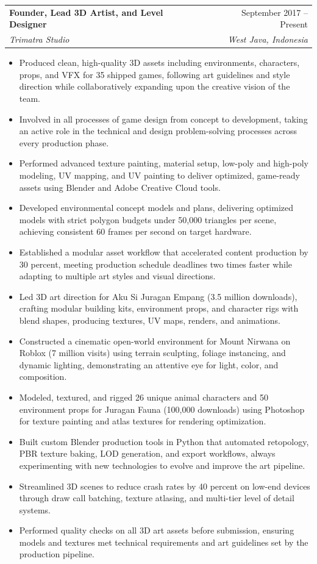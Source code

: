 \documentclass[letterpaper,11pt]{article}
\makeatletter
\newcommand{\resumeItem}[1]{
  \item\small{
    {#1 \vspace{-2pt}}
  }
}
\newcommand{\resumeSubheading}[4]{
  \vspace{-2pt}\item
    \begin{tabular*}{0.97\textwidth}[t]{l@{\extracolsep{\fill}}r}
      \textbf{#1} & #2 \\
      \textit{\small#3} & \textit{\small #4} \\
    \end{tabular*}\vspace{-7pt}
}
\newcommand{\resumeItemListStart}{\begin{itemize}}
\newcommand{\resumeItemListEnd}{\end{itemize}\vspace{-5pt}}
\makeatother
\begin{document}
    \resumeSubheading
      {Founder, Lead 3D Artist, and Level Designer}{September 2017 -- Present}
      {Trimatra Studio}{West Java, Indonesia}
      \resumeItemListStart
        \resumeItem{Produced clean, high-quality 3D assets including environments, characters, props, and VFX for 35 shipped games, following art guidelines and style direction while collaboratively expanding upon the creative vision of the team.}
        \resumeItem{Involved in all processes of game design from concept to development, taking an active role in the technical and design problem-solving processes across every production phase.}
        \resumeItem{Performed advanced texture painting, material setup, low-poly and high-poly modeling, UV mapping, and UV painting to deliver optimized, game-ready assets using Blender and Adobe Creative Cloud tools.}
        \resumeItem{Developed environmental concept models and plans, delivering optimized models with strict polygon budgets under 50,000 triangles per scene, achieving consistent 60 frames per second on target hardware.}
        \resumeItem{Established a modular asset workflow that accelerated content production by 30 percent, meeting production schedule deadlines two times faster while adapting to multiple art styles and visual directions.}
        \resumeItem{Led 3D art direction for Aku Si Juragan Empang (3.5 million downloads), crafting modular building kits, environment props, and character rigs with blend shapes, producing textures, UV maps, renders, and animations.}
        \resumeItem{Constructed a cinematic open-world environment for Mount Nirwana on Roblox (7 million visits) using terrain sculpting, foliage instancing, and dynamic lighting, demonstrating an attentive eye for light, color, and composition.}
        \resumeItem{Modeled, textured, and rigged 26 unique animal characters and 50 environment props for Juragan Fauna (100,000 downloads) using Photoshop for texture painting and atlas textures for rendering optimization.}
        \resumeItem{Built custom Blender production tools in Python that automated retopology, PBR texture baking, LOD generation, and export workflows, always experimenting with new technologies to evolve and improve the art pipeline.}
        \resumeItem{Streamlined 3D scenes to reduce crash rates by 40 percent on low-end devices through draw call batching, texture atlasing, and multi-tier level of detail systems.}
        \resumeItem{Performed quality checks on all 3D art assets before submission, ensuring models and textures met technical requirements and art guidelines set by the production pipeline.}
      \resumeItemListEnd
\end{document}
